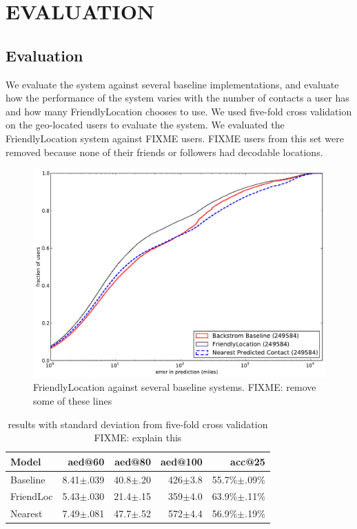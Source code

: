 \ifdefined\THESIS
    \chapter{\uppercase{Evaluation}}
\else
    \section{Evaluation}
\fi

We evaluate the system against several baseline implementations, and evaluate
how the performance of the system varies with the number of contacts a user has
and how many FriendlyLocation chooses to use.
We used five-fold cross validation on the geo-located users to evaluate the system.
We evaluated the FriendlyLocation system against FIXME users.
FIXME users from this set were removed because none of their friends or
followers had decodable locations.


\begin{figure}[tb]
\centering
\includegraphics[width=\linewidth]{figures/fl_basic.pdf}
\caption{
    FriendlyLocation against several baseline systems.
    FIXME: remove some of these lines
}
\label{fig:NearProbFit}
\end{figure}

\begin{table}[tb]
\centering
\begin{tabular}{l  r r r r}
    Model
    & aed@60
    & aed@80
    & aed@100
    & acc@25 \\
    \hline
    Baseline & 8.41$\pm$.039 & 40.8$\pm$.20 & 426$\pm$3.8 & 55.7\%$\pm$.09\% \\
    FriendLoc & 5.43$\pm$.030 & 21.4$\pm$.15 & 359$\pm$4.0 & 63.9\%$\pm$.11\% \\
    Nearest & 7.49$\pm$.081 & 47.7$\pm$.52 & 572$\pm$4.4 & 56.9\%$\pm$.19\% \\
\end{tabular}
\caption{
results with standard deviation from five-fold cross validation
FIXME: explain this
}
\label{tab:results}
\end{table}

